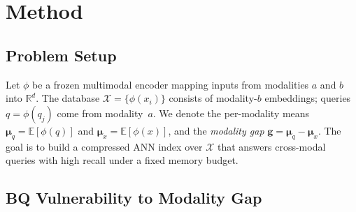 \section{Method}\label{sec:method}

\subsection{Problem Setup}\label{sec:setup}

Let $\phi$ be a frozen multimodal encoder mapping inputs from modalities $a$
and $b$ into $\mathbb{R}^d$.
The database $\mathcal{X} = \{\phi(x_i)\}$ consists of modality-$b$ embeddings;
queries $q = \phi(q_j)$ come from modality~$a$.
We denote the per-modality means $\boldsymbol{\mu}_q = \mathbb{E}[\phi(q)]$
and $\boldsymbol{\mu}_x = \mathbb{E}[\phi(x)]$,
and the \emph{modality gap} $\mathbf{g} = \boldsymbol{\mu}_q - \boldsymbol{\mu}_x$.
The goal is to build a compressed ANN index over $\mathcal{X}$ that answers
cross-modal queries with high recall under a fixed memory budget.

\subsection{BQ Vulnerability to Modality Gap}\label{sec:why}

